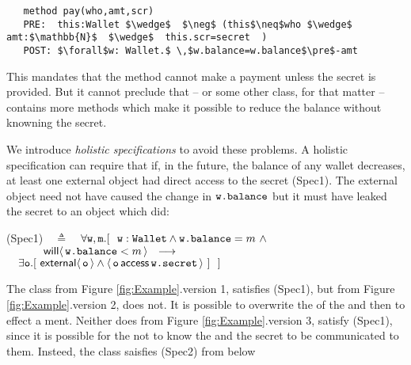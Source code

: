\begin{lstlisting}
   method pay(who,amt,scr)
   PRE:  this:Wallet $\wedge$  $\neg$ (this$\neq$who $\wedge$ amt:$\mathbb{N}$  $\wedge$  this.scr=secret  )
   POST: $\forall$w: Wallet.$ \,$w.balance=w.balance$\pre$-amt 
 \end{lstlisting}
\vspace{-.2in}

This mandates that the  method cannot make a payment unless the secret is
provided. But it cannot preclude that  -- or some other class, for that matter -- contains more methods 
which  make it possible to reduce the balance  without knowning the
secret.

We introduce \emph{holistic specifications} to avoid these problems. A
holistic specification can require that if, in the future, the balance
of any wallet  decreases, at least one external object 
had direct access to the secret (Spec1).  The external object need not
have caused the change in ${\mbox{\tt{w.balance}}}$ but it must have leaked
the secret to an object which did:

\vspace{.2in}
(Spec1)\ \  $\triangleq$\ \ $\forall {\mbox{\tt{w}}},{\mbox{\tt{m}}}.[\ \ {\mbox{\tt{w}}}:{\mbox{\tt{Wallet}}} \wedge {\mbox{\tt{w.balance}}}=m\ \wedge$ \\
$\ \ \ \ \ \ \ \ \ \ \Future{\prg{w.balance}<m} \ \ 
    \longrightarrow$\\
$\ \ \   \exists \prg{o}. [\  \External{\prg{o}} \wedge  \CanAccess{\prg{o}}{\prg{w.secret}}\ ]  \  \ ] \hfill $
\vspace{.2in}


The class  from Figure \ref{fig:Example}.version 1, satisfies (Spec1), but  from Figure \ref{fig:Example}.version 2, does not.
It is possible to overwrite the \prg{secret} of the \prg{Wallet} and then to effect a \prg{pay}ment. Neither does \prg{Wallet} from Figure \ref{fig:Example}.version 3,  satisfy (Spec1), since it is possible for the  not to know the  and the secret to be 
communicated to them. Insteed, the class saisfies (Spec2) from below
 

